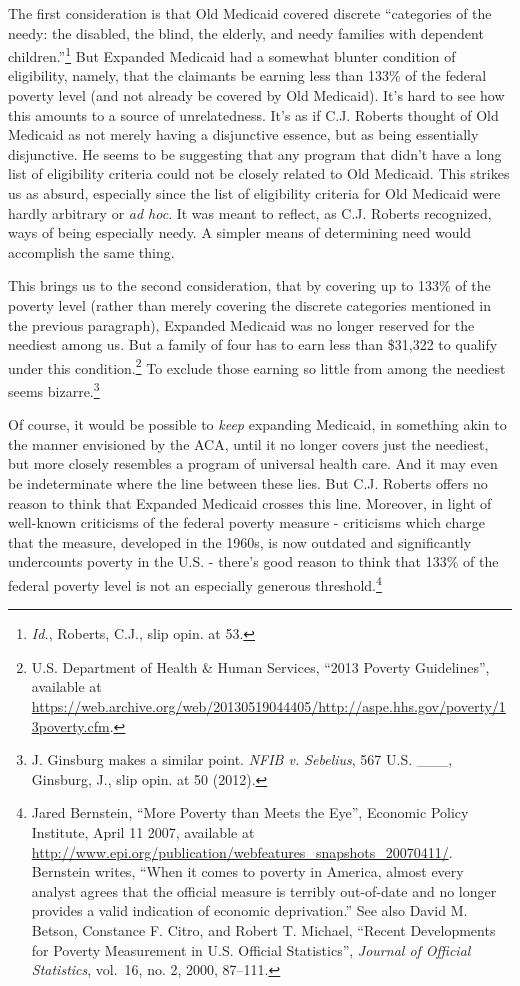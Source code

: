 \documentclass[
  11pt,
  letterpaper,
  DIV=11,
  numbers=noendperiod,
  twoside]{scrartcl}
\begin{document}
The first consideration is that Old Medicaid covered discrete
``categories of the needy: the disabled, the blind, the elderly, and
needy families with dependent children.''\footnote{\emph{Id.}, Roberts,
  C.J., slip opin. at 53.} But Expanded Medicaid had a somewhat blunter
condition of eligibility, namely, that the claimants be earning less
than 133\% of the federal poverty level (and not already be covered by
Old Medicaid). It's hard to see how this amounts to a source of
unrelatedness. It's as if C.J. Roberts thought of Old Medicaid as not
merely having a disjunctive essence, but as being essentially
disjunctive. He seems to be suggesting that any program that didn't have
a long list of eligibility criteria could not be closely related to Old
Medicaid. This strikes us as absurd, especially since the list of
eligibility criteria for Old Medicaid were hardly arbitrary or \emph{ad
hoc}. It was meant to reflect, as C.J. Roberts recognized, ways of being
especially needy. A simpler means of determining need would accomplish
the same thing.

This brings us to the second consideration, that by covering up to 133\%
of the poverty level (rather than merely covering the discrete
categories mentioned in the previous paragraph), Expanded Medicaid was
no longer reserved for the neediest among us. But a family of four has
to earn less than \$31,322 to qualify under this condition.\footnote{U.S.
  Department of Health \& Human Services, ``2013 Poverty Guidelines'',
  available at
  \url{https://web.archive.org/web/20130519044405/http://aspe.hhs.gov/poverty/13poverty.cfm}.}
To exclude those earning so little from among the neediest seems
bizarre.\footnote{J. Ginsburg makes a similar point. \emph{NFIB v.
  Sebelius}, 567 U.S. \_\_\_, Ginsburg, J., slip opin. at 50 (2012).}

Of course, it would be possible to \emph{keep} expanding Medicaid, in
something akin to the manner envisioned by the ACA, until it no longer
covers just the neediest, but more closely resembles a program of
universal health care. And it may even be indeterminate where the line
between these lies. But C.J. Roberts offers no reason to think that
Expanded Medicaid crosses this line. Moreover, in light of well-known
criticisms of the federal poverty measure - criticisms which charge that
the measure, developed in the 1960s, is now outdated and significantly
undercounts poverty in the U.S. - there's good reason to think that
133\% of the federal poverty level is not an especially generous
threshold.\footnote{Jared Bernstein, ``More Poverty than Meets the
  Eye'', Economic Policy Institute, April 11 2007, available at
  \url{http://www.epi.org/publication/webfeatures_snapshots_20070411/}.
  Bernstein writes, ``When it comes to poverty in America, almost every
  analyst agrees that the official measure is terribly out-of-date and
  no longer provides a valid indication of economic deprivation.'' See
  also David M. Betson, Constance F. Citro, and Robert T. Michael,
  ``Recent Developments for Poverty Measurement in U.S. Official
  Statistics'', \emph{Journal of Official Statistics}, vol.~16, no. 2,
  2000, 87--111.}
\end{document}
